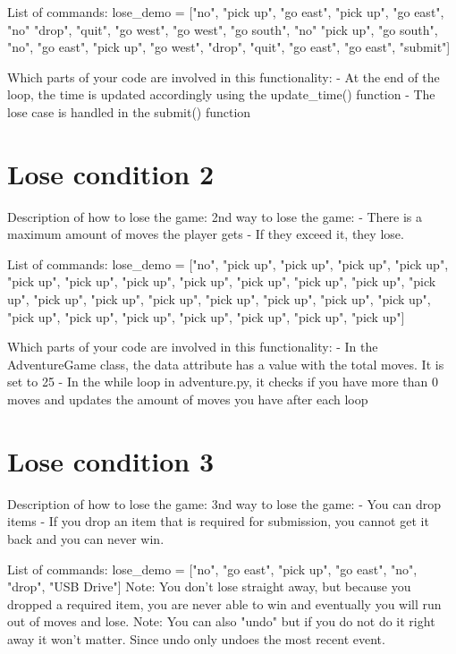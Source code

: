 \documentclass[11pt]{article}
\begin{document}
List of commands: lose_demo = ["no", "pick up", "go east", "pick up", "go east", "no"
                 "drop", "quit", "go west", "go west", "go south", "no"
                 "pick up", "go south", "no", "go east", "pick up",
                 "go west", "drop", "quit", "go east", "go east", "submit"]

Which parts of your code are involved in this functionality:
    - At the end of the loop, the time is updated accordingly using the update_time() function
    - The lose case is handled in the submit() function

\section*{Lose condition 2}
Description of how to lose the game:
2nd way to lose the game:
    - There is a maximum amount of moves the player gets
    - If they exceed it, they lose.

List of commands: lose_demo = ["no", "pick up", "pick up", "pick up", "pick up", "pick up", "pick up",
                               "pick up", "pick up", "pick up", "pick up", "pick up", "pick up", "pick up",
                               "pick up", "pick up", "pick up", "pick up", "pick up", "pick up", "pick up",
                               "pick up", "pick up", "pick up", "pick up", "pick up", "pick up"]

Which parts of your code are involved in this functionality:
    - In the AdventureGame class, the data attribute has a value with the total moves. It is set to 25
    - In the while loop in adventure.py, it checks if you have more than 0 moves and updates the amount of moves you have after each loop

\section*{Lose condition 3}
Description of how to lose the game:
3nd way to lose the game:
    - You can drop items
    - If you drop an item that is required for submission, you cannot get it back and you can never win.

List of commands: lose_demo = ["no", "go east", "pick up", "go east", "no", "drop", "USB Drive"]
Note: You don't lose straight away, but because you dropped a required item, you are never able to win and eventually you will run out of moves and lose.
Note: You can also "undo" but if you do not do it right away it won't matter. Since undo only undoes the most recent event.
\end{document}
